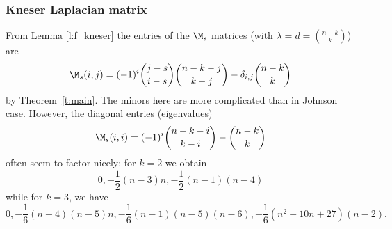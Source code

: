 \subsubsection{Kneser Laplacian matrix}

From Lemma \ref{l:f_kneser} the entries of the $\M_s$ matrices (with $\lambda = d = \binom{n-k}{k}$) are
\[ \M_s(i,j) = (-1)^i\binom{j-s}{i-s} \binom{n-k-j}{k-j} - \delta_{i,j} \binom{n-k}{k} \]
by Theorem~\ref{t:main}.  The minors here are more complicated than in Johnson case.
However, the diagonal entries (eigenvalues)
\[ \M_s(i,i) = (-1)^i \binom{n-k-i}{k-i} - \binom{n-k}{k}  \]
often seem to factor nicely; for $k = 2$ we obtain
\[ 0, -\frac{1}{2}(n-3)n, -\frac{1}{2}(n-1)(n-4) \]
while for $k = 3$, we have
\[ 0, -\frac{1}{6}(n-4)(n-5)n, -\frac{1}{6}(n-1)(n-5)(n-6), -\frac{1}{6}(n^2 - 10n + 27)(n-2). \]

